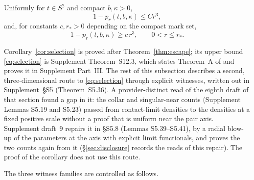 \begin{corollary}\label{cor:selection}
Uniformly for $t\in S^2$ and compact $b,\kappa>0$,
\begin{equation}\tag{3.13}\label{eq:selection}
1-p_r(t,b,\kappa)\le Cr^3,
\end{equation}
and, for constants $c,r_*>0$ depending on the compact mark set,
\begin{equation}\tag{3.13a}\label{eq:selection-lower}
1-p_r(t,b,\kappa)\ge c\,r^3,\qquad 0<r\le r_* .
\end{equation}
\end{corollary}

Corollary~\ref{cor:selection} is proved after Theorem~\ref{thm:escape}; its upper bound \eqref{eq:selection} is Supplement Theorem~S12.3, which states Theorem~A of  and proves it in Supplement Part~III. The rest of this subsection describes a second, three-dimensional route to \eqref{eq:selection} through explicit witnesses, written out in Supplement~\S S5 (Theorem~S5.36). A provider-distinct read of the eighth draft of that section found a gap in it: the collar and singular-near counts (Supplement Lemmas S5.19 and S5.23) passed from contact-limit densities to the densities at a fixed positive scale without a proof that is uniform near the pair axis. Supplement draft~9 repairs it in \S S5.8 (Lemmas S5.39--S5.41), by a radial blow-up of the parameters at the axis with explicit limit functionals, and proves the two counts again from it (\S\ref{sec:disclosure} records the reads of this repair). The proof of the corollary does not use this route.

The three witness families are controlled as follows.

